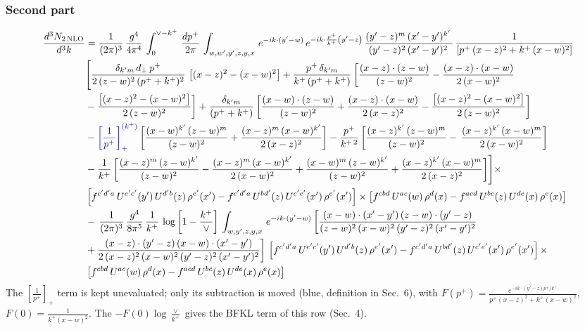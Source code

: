 \documentclass[9pt]{article}
\newcommand{\new}[1]{{\color{blue}#1}}
\numberwithin{equation}{section}
\begin{document}
\subsubsection{Second part}
\begin{align}
 \frac{d^{3}N_{2\,\rm NLO}}{d^{3}k} & = \frac{1}{(2\pi)^{3}}\,\frac{g^{4}}{4\pi^{4}}\,\int_{0}^{\vee-k^{+}}\, \frac{dp^{+}}{2\pi}\,\int_{w,w',y',z,y,x}\, e^{-ik\cdot (y'-w)}\,e^{-ik\cdot \frac{p^{+}}{k^{+}}\left(y'-z\right)}\, \frac{(y'-z)^{m}\,(x'-y')^{k'}\,}{(y'-z)^{2}\,(x'-y')^{2}\,}\, \frac{1}{\left[p^{+}\,(x-z)^{2}+k^{+}\,(x-w)^{2}\right]}\notag \\ & \Bigg[\frac{\delta_{k'm}\,d_{\perp}\,p^{+}}{2\,(z-w)^{2}\,(p^{+}+k^{+})^{2}}\, \left[(x-z)^{2}-(x-w)^{2}\right]+\frac{p^{+}\,\delta_{k'm}}{k^{+}\,(p^{+}+k^{+})}\,\bigg[\frac{(x-z)\cdot (z-w)}{(z-w)^{2}} -\frac{(x-z)\cdot (x-w)}{2\,(x-w)^{2}}\notag \\ & -\frac{\left[(x-z)^{2}-(x-w)^{2}\right]}{2\,(z-w)^{2}}\bigg] +\frac{\delta_{k'm}}{(p^{+}+k^{+})}\,\bigg[\frac{(x-w)\cdot (z-w)}{(z-w)^{2}}+\frac{(x-z)\cdot (x-w)}{2\,(x-z)^{2}} -\frac{\left[(x-z)^{2}-(x-w)^{2}\right]}{2\,(z-w)^{2}}\bigg]\notag \\ & -\new{\left[\frac{1}{p^{+}}\right]_{+}^{(k^{+})}}\,\bigg[\frac{(x-w)^{k'}\,(z-w)^{m}}{(z-w)^{2}}+\frac{(x-z)^{m}\,(x-w)^{k'}}{2\,(x-z)^{2}}\bigg]-\frac{p^{+}}{k^{+\,2}}\,\bigg[\frac{(x-z)^{k'}\,(z-w)^{m}}{(z-w)^{2}} -\,\frac{(x-z)^{k'}\,(x-w)^{m}}{2\,(x-w)^{2}}\bigg]\notag \\ & -\frac{1}{k^{+}}\,\bigg[\frac{(x-z)^{m}\,(z-w)^{k'}}{(z-w)^{2}}-\frac{(x-z)^{m}\,(x-w)^{k'}}{2\,(x-w)^{2}}+\frac{(x-w)^{m}\,(z-w)^{k'}}{(z-w)^{2}} +\frac{(x-z)^{k'}\,(x-w)^{m}}{2\,(x-z)^{2}}\bigg]\Bigg]\times\,\notag \\ & \left[f^{c'd'a}\,U^{e'c'}(y')\,U^{d'b}(z)\,\rho^{e'}(x')-f^{c'd'a}\, 
    U^{bd'}(z)\,U^{c'e'}(x')\,\rho^{e'}(x')\right]\times \left[f^{cbd}\,U^{ac}(w)\,\rho^{d}(x) -f^{acd}\,U^{bc}(z)\,U^{de}(x)\,\rho^{e}(x)\right]\notag \\ &  -\, \frac{1}{(2\pi)^{3}}\,\frac{g^{4}}{8\pi^{5}}\,\frac{1}{k^{+}}\,\log{\left[1-\frac{k^{+}}{\vee}\right]}\,\int_{w,y',z,y,x}\, e^{-ik\cdot (y'-w)}\,\bigg[\frac{(x-w)\cdot (x'-y')\,(z-w)\cdot (y'-z)}{(z-w)^{2}\,(x-w)^{2}\,(y'-z)^{2}\,(x'-y')^{2}}\notag \\ & +\frac{(x-z)\cdot (y'-z)\,(x-w)\cdot (x'-y')}{2\,(x-z)^{2}\,(x-w)^{2}\,(y'-z)^{2}\,(x'-y')^{2}}\bigg]\, \left[f^{c'd'a}\,U^{e'c'}(y')\,U^{d'b}(z)\,\rho^{e'}(x')-f^{c'd'a}\, 
    U^{bd'}(z)\,U^{c'e'}(x')\,\rho^{e'}(x')\right]\times\notag \\ &  \left[f^{cbd}\,U^{ac}(w)\,\rho^{d}(x) -f^{acd}\,U^{bc}(z)\,U^{de}(x)\,\rho^{e}(x)\right] 
\end{align}
\new{The $\left[\frac{1}{p^+}\right]_+$ term is kept unevaluated; only its subtraction is moved (blue, definition in Sec.~6), with $F(p^+)=\frac{e^{-ik\cdot(y'-z)p^+/k^+}}{p^+(x-z)^2+k^+(x-w)^2}$, $F(0)=\frac{1}{k^+(x-w)^2}$. The $-F(0)\log\frac{\vee}{k^+}$ gives the BFKL term of this row (Sec.~4).}
\end{document}
